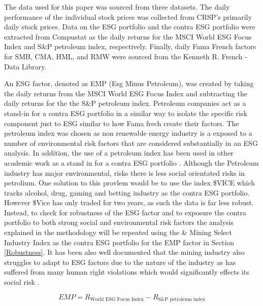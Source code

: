 The data used for this paper was sourced from three datasets. The daily performance of the individual stock prices was collected from CRSP's primarily daily stock prices. Data on the ESG portfolio and the contra ESG portfolio were extracted from Compustat as the daily returns for the MSCI World ESG Focus Index and S\&P petroleum index, respectively. Finally, daily Fama French factors for SMB, CMA, HML, and RMW were sourced from the Kenneth R. French - Data Library.  



An ESG factor, denoted as EMP (Esg Minus Petroleum), was created by taking the daily returns from the MSCI World ESG Focus Index and subtracting the daily returns for the the  S\&P petroleum index. Petroleum companies act as a stand-in for a contra ESG portfolio in a similar way to isolate the specific risk component just to ESG similar to how Fama frech create their factors. The  petroleum index was chosen as non renewable energy industry is a exposed to a number of environmental risk factors that are considered substantially in an ESG analysis. In addition, the use of a petroleum index has been used in other academic work as a stand in for a contra ESG portfolio \cite{Frynas2005TheFD}. Although the Petroleum industry has major environmental, risks there is less social orientated risks in petrolium. One solution to this provlem would be to use the index \$VICE which tracks alcohol, drug, gaming and betting industry  as the  contra ESG portfolio. However \$Vice has only traded for two years, as such the data is far less robust. Instead, to check for robustness of the ESG factor and to exposure the contra portfolio to both strong social and environmental risk factors the analysis explained in the methodology will be repeated using the \& Mining Select Industry Index as the contra ESG portfolio for the EMP factor in Section \ref{Robustness}. It has been also well documented that the mining industry also struggles to adapt to ESG factors due to the nature of the industry as has suffered from many human right violations which would significantly effects its social risk  \cite{Kapelus2002MiningCS}.

\begin{equation}
    \label{making_EMP}
    EMP = R_{\text{World ESG Focus Index}}- R_{\text{S\&P petroleum index}}
\end{equation}

